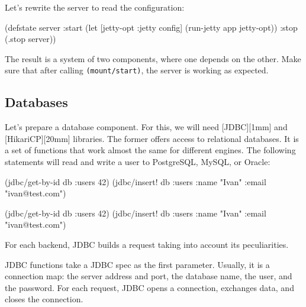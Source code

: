 \fi

\noindent
Let's rewrite the server to read the configuration:

\begin{english}
  \begin{clojure}
(defstate server
  :start
  (let [{jetty-opt :jetty} config]
    (run-jetty app jetty-opt))
  :stop
  (.stop server))
  \end{clojure}
\end{english}

The result is a system of two components, where one depends on the other. Make sure that after calling \verb|(mount/start)|, the server is working as expected.

\subsection{Databases}


Let's prepare a database component. For this, we will need [JDBC][1mm] and [HikariCP][20mm] libraries. The former offers access to relational databases. It is a set of functions that work almost the same for different engines. The following statements will read and write a user to PostgreSQL, MySQL, or Oracle:

\ifnarrow

\begin{english}
  \begin{clojure}
(jdbc/get-by-id db :users 42)
(jdbc/insert! db :users
  {:name "Ivan" :email "ivan@test.com"})
  \end{clojure}
\end{english}

\else

\begin{english}
  \begin{clojure}
(jdbc/get-by-id db :users 42)
(jdbc/insert! db :users {:name "Ivan" :email "ivan@test.com"})
  \end{clojure}
\end{english}

\fi

\noindent
For each backend, JDBC builds a request taking into account its peculiarities.


JDBC functions take a JDBC spec as the first parameter. Usually, it is a connection map: the server address and port, the database name, the user, and the password. For each request, JDBC opens a connection, exchanges data, and closes the connection.

